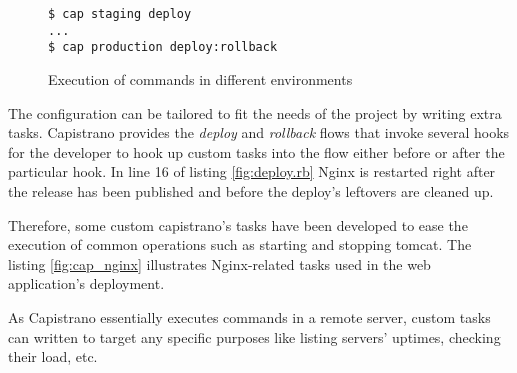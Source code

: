\begin{figure}[h]
  \texttt{\$ cap staging deploy}\\
  \texttt{...}\\
  \texttt{\$ cap production deploy:rollback}\\
  \caption{Execution of commands in different environments}
  \label{fig:capistrano}
\end{figure}

The configuration can be tailored to fit the needs of the project by writing extra tasks. Capistrano provides the \textit{deploy} and \textit{rollback} flows that invoke several hooks for the developer to hook up custom tasks into the flow either before or after the particular hook. In line 16 of listing \ref{fig:deploy.rb} Nginx is restarted right after the release has been published and before the deploy's leftovers are cleaned up.

Therefore, some custom capistrano's tasks have been developed to ease the execution of common operations such as starting and stopping tomcat. The listing \ref{fig:cap_nginx} illustrates Nginx-related tasks used in the web application's deployment.


As Capistrano essentially executes commands in a remote server, custom tasks can written to target any specific purposes like listing servers' uptimes, checking their load, etc.
